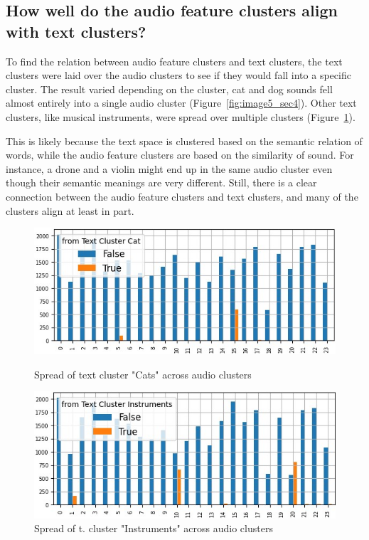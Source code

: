 \subsection{How well do the audio feature clusters align with text clusters?}
\label{sec:Text Features:c}


To find the relation between audio feature clusters and text clusters, the text clusters were laid over the audio clusters to see if they would fall into a specific cluster. The result varied depending on the cluster, cat and dog sounds fell almost entirely into a single audio cluster (Figure~\ref{fig:image5_sec4}). Other text clusters, like musical instruments, were spread over multiple clusters (Figure~\ref{fig:image6_sec4}).

This is likely because the text space is clustered based on the semantic relation of words, while the audio feature clusters are based on the similarity of sound. For instance, a drone and a violin might end up in the same audio cluster even though their semantic meanings are very different. 
Still, there is a clear connection between the audio feature clusters and text clusters, and many of the clusters align at least in part.

\begin{figure}[ht]
  \centering
  \begin{minipage}[b]{0.49\textwidth}
    \centering
    \includegraphics[width=\textwidth]{figs/cat_test_cluster_over_audio_cluster.jpg}
    \caption{Spread of text cluster "Cats" across audio clusters}
    \label{fig:image5_sec4}
  \end{minipage}
  \hfill
  \begin{minipage}[b]{0.49\textwidth}
    \centering
    \includegraphics[width=\textwidth]{figs/instruments_test_cluster_over_audio_cluster.jpg}
    \caption{Spread of t. cluster "Instruments" across audio clusters}
    \label{fig:image6_sec4}
  \end{minipage}
 \end{figure}



